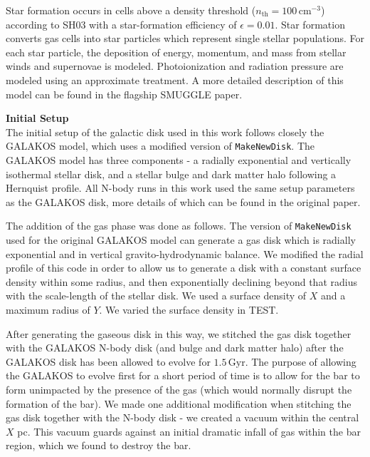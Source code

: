 \documentclass{natureprintstyle}
\begin{document}
Star formation occurs in cells above a density threshold
($n_{\textrm{th}}=100\,\textrm{cm}^{-3}$) according to SH03 with a
star-formation efficiency of $\epsilon = 0.01$. Star formation converts gas
cells into star particles which represent single stellar populations. For each
star particle, the deposition of energy, momentum, and mass from stellar winds
and supernovae is modeled. Photoionization and radiation pressure are modeled
using an approximate treatment. A more detailed description of this model can
be found in the flagship SMUGGLE paper.\cite{2019MNRAS.489.4233M}

\vspace{12pt}

\noindent
{\bf Initial Setup}
\\
\noindent
The initial setup of the galactic disk used in this work follows closely the
GALAKOS model\cite{2020ApJ...890..117D}, which uses a modified version of
\texttt{MakeNewDisk}.\cite{2005MNRAS.361..776S} The GALAKOS model has three
components - a radially exponential and vertically isothermal stellar disk,
and a stellar bulge and dark matter halo following a Hernquist
profile.\cite{1990ApJ...356..359H} All N-body runs in this work used the same
setup parameters as the GALAKOS disk, more details of which can be found in
the original paper.

The addition of the gas phase was done as follows. The version of
\texttt{MakeNewDisk} used for the original GALAKOS model can generate a gas
disk which is radially exponential and in vertical gravito-hydrodynamic
balance. We modified the radial profile of this code in order to allow us to
generate a disk with a constant surface density within some radius, and then
exponentially declining beyond that radius with the scale-length of the
stellar disk. We used a surface density of $X$ and a maximum radius of $Y$. We
varied the surface density in TEST.

After generating the gaseous disk in this way, we stitched the gas disk
together with the GALAKOS N-body disk (and bulge and dark matter halo) after
the GALAKOS disk has been allowed to evolve for $1.5\,\textrm{Gyr}$. The
purpose of allowing the GALAKOS to evolve first for a short period of time is
to allow for the bar to form unimpacted by the presence of the gas (which
would normally disrupt the formation of the bar). We made one additional
modification when stitching the gas disk together with the N-body disk - we
created a vacuum within the central $X$ pc. This vacuum guards against an
initial dramatic infall of gas within the bar region, which we found to
destroy the bar.
\end{document}
